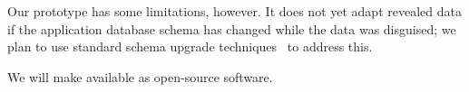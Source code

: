 %
%
Our prototype has some limitations, however.
%
%
It does not yet adapt revealed data if the application database schema has
changed while the data was disguised; we plan to use standard schema upgrade
techniques~\cite{hotcrp-autoupgrade, f1-schema-change,
automated-schema-evol-prism} to address this.
%

%
We will make \sys available as open-source software.
%


%
%
